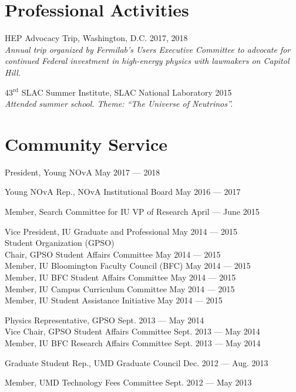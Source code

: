 \documentclass[11pt]{cv}
\begin{document}
\begin{cv}
\section{Professional Activities}

HEP Advocacy Trip, Washington, D.C. \hfill 2017, 2018 \\
\emph{Annual trip organized by Fermilab's Users Executive Committee to advocate for continued Federal investment in high-energy physics with lawmakers on Capitol Hill.}

43$^{\text{rd}}$ SLAC Summer Institute, SLAC National Laboratory \hfill 2015 \\
\emph{Attended summer school. Theme: ``The Universe of Neutrinos''.}


\section{Community Service}

President, Young NOvA \hfill May 2017 --- 2018

Young NOvA Rep., NOvA Institutional Board \hfill May 2016 --- 2017

Member, Search Committee for IU VP of Research \hfill April --- June 2015

Vice President, IU Graduate and Professional \hfill May 2014 --- 2015 \\
Student Organization (GPSO) \\
Chair, GPSO Student Affairs Committee \hfill May 2014 --- 2015 \\
Member, IU Bloomington Faculty Council (BFC) \hfill May 2014 --- 2015 \\
Member, IU BFC Student Affairs Committee \hfill May 2014 --- 2015 \\
Member, IU Campus Curriculum Committee \hfill May 2014 --- 2015 \\
Member, IU Student Assistance Initiative \hfill May 2014 --- 2015

Physics Representative, GPSO \hfill Sept. 2013 --- May 2014 \\
Vice Chair, GPSO Student Affairs Committee \hfill Sept. 2013 --- May 2014 \\
Member, IU BFC Research Affairs Committee \hfill Sept. 2013 --- May 2014

Graduate Student Rep., UMD Graduate Council \hfill Dec. 2012 --- Aug. 2013

Member, UMD Technology Fees Committee \hfill Sept. 2012 --- May 2013


\end{cv}
\end{document}
